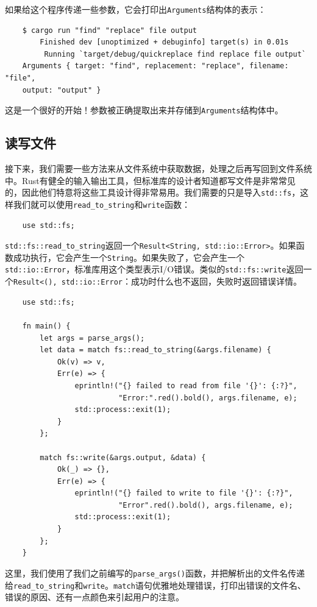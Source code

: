 如果给这个程序传递一些参数，它会打印出\texttt{Arguments}结构体的表示：
\begin{verbatim}
    $ cargo run "find" "replace" file output
        Finished dev [unoptimized + debuginfo] target(s) in 0.01s
         Running `target/debug/quickreplace find replace file output`
    Arguments { target: "find", replacement: "replace", filename: "file",
    output: "output" }
\end{verbatim}

这是一个很好的开始！参数被正确提取出来并存储到\texttt{Arguments}结构体中。

\subsection{读写文件}
接下来，我们需要一些方法来从文件系统中获取数据，处理之后再写回到文件系统中。Rust有健全的输入输出工具，但标准库的设计者知道都写文件是非常常见的，因此他们特意将这些工具设计得非常易用。我们需要的只是导入\texttt{std::fs}，这样我们就可以使用\texttt{read\_to\_string}和\texttt{write}函数：
\begin{verbatim}
    use std::fs;
\end{verbatim}

\texttt{std::fs::read\_to\_string}返回一个\texttt{Result<String, std::io::Error>}。如果函数成功执行，它会产生一个\texttt{String}。如果失败了，它会产生一个\texttt{std::io::Error}，标准库用这个类型表示I/O错误。类似的\texttt{std::fs::write}返回一个\texttt{Result<(), std::io::Error}：成功时什么也不返回，失败时返回错误详情。

\begin{verbatim}
    use std::fs;

    fn main() {
        let args = parse_args();
        let data = match fs::read_to_string(&args.filename) {
            Ok(v) => v,
            Err(e) => {
                eprintln!("{} failed to read from file '{}': {:?}",
                          "Error:".red().bold(), args.filename, e);
                std::process::exit(1);
            }
        };

        match fs::write(&args.output, &data) {
            Ok(_) => {},
            Err(e) => {
                eprintln!("{} failed to write to file '{}': {:?}",
                          "Error".red().bold(), args.filename, e);
                std::process::exit(1);
            }
        };
    }
\end{verbatim}

这里，我们使用了我们之前编写的\texttt{parse\_args()}函数，并把解析出的文件名传递给\texttt{read\_to\_string}和\texttt{write}。\texttt{match}语句优雅地处理错误，打印出错误的文件名、错误的原因、还有一点颜色来引起用户的注意。


